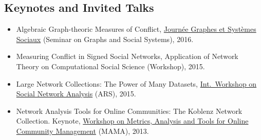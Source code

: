 \documentclass[line,margin]{res}
\begin{document}
\begin{resume}
\section{Keynotes and Invited Talks}
\begin{itemize}
\item Algebraic Graph-theoric Measures of Conflict, 
  \href{http://jgss.sciencesconf.org/}{Journée Graphes et Systèmes
    Sociaux} (Seminar on Graphs and Social Systems), 2016.  
\item Measuring Conflict in Signed Social Networks, 
  Application of Network Theory on Computational Social Science
  (Workshop), 2015.
\item Large Network Collections:  The Power of Many Datasets,
  \href{http://www.ars15.unisa.it/}{Int.\ Workshop on Social
    Network Analysis} (ARS), 2015. 
\item Network Analysis Tools for Online Communities: The Koblenz Network
  Collection. Keynote, \href{http://mama.west.uni-koblenz.de/}{Workshop
    on Metrics, Analysis and Tools for Online Community Management}
  (MAMA), 2013.  
\end{itemize}


\end{resume}
\end{document}
